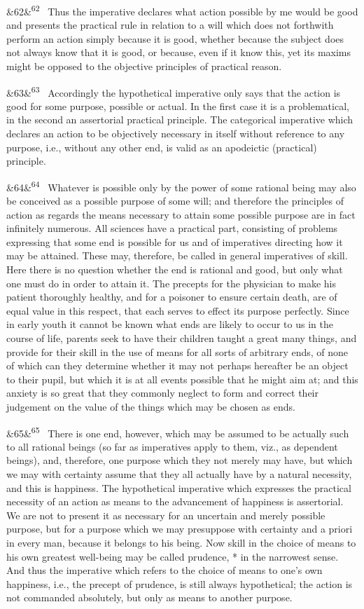 \documentclass[12pt]{article}
\newcommand{\para}[1][]{\par\noindent\ifx&#1&\else\textsuperscript{\footnotesize #1}~\fi}
\begin{document}
\para[62] Thus the imperative declares what action possible by me would be good and presents the practical rule in relation to a will which does not forthwith perform an action simply because it is good, whether because the subject does not always know that it is good, or because, even if it know this, yet its maxims might be opposed to the objective principles of practical reason.

\para[63] Accordingly the hypothetical imperative only says that the action is good for some purpose, possible or actual. In the first case it is a problematical, in the second an assertorial practical principle. The categorical imperative which declares an action to be objectively necessary in itself without reference to any purpose, i.e., without any other end, is valid as an apodeictic (practical) principle.

\para[64] Whatever is possible only by the power of some rational being may also be conceived as a possible purpose of some will; and therefore the principles of action as regards the means necessary to attain some possible purpose are in fact infinitely numerous. All sciences have a practical part, consisting of problems expressing that some end is possible for us and of imperatives directing how it may be attained. These may, therefore, be called in general imperatives of skill. Here there is no question whether the end is rational and good, but only what one must do in order to attain it. The precepts for the physician to make his patient thoroughly healthy, and for a poisoner to ensure certain death, are of equal value in this respect, that each serves to effect its purpose perfectly. Since in early youth it cannot be known what ends are likely to occur to us in the course of life, parents seek to have their children taught a great many things, and provide for their skill in the use of means for all sorts of arbitrary ends, of none of which can they determine whether it may not perhaps hereafter be an object to their pupil, but which it is at all events possible that he might aim at; and this anxiety is so great that they commonly neglect to form and correct their judgement on the value of the things which may be chosen as ends.

\para[65] There is one end, however, which may be assumed to be actually such to all rational beings (so far as imperatives apply to them, viz., as dependent beings), and, therefore, one purpose which they not merely may have, but which we may with certainty assume that they all actually have by a natural necessity, and this is happiness. The hypothetical imperative which expresses the practical necessity of an action as means to the advancement of happiness is assertorial. We are not to present it as necessary for an uncertain and merely possible purpose, but for a purpose which we may presuppose with certainty and a priori in every man, because it belongs to his being. Now skill in the choice of means to his own greatest well-being may be called prudence, * in the narrowest sense. And thus the imperative which refers to the choice of means to one's own happiness, i.e., the precept of prudence, is still always hypothetical; the action is not commanded absolutely, but only as means to another purpose.
\end{document}

